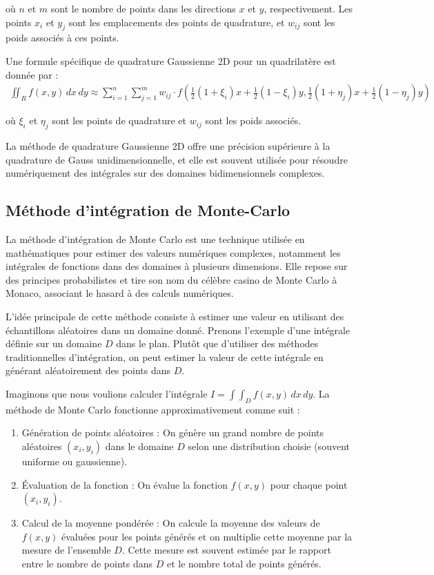 \documentclass[10pt,a4paper]{article}
\begin{document}
où $n$ et $m$ sont le nombre de points dans les directions $x$ et $y$, respectivement. Les points $x_i$ et $y_j$ sont les emplacements des points de quadrature, et $w_{ij}$ sont les poids associés à ces points.

Une formule spécifique de quadrature Gaussienne 2D pour un quadrilatère est donnée par :
\begin{align*}
\iint_{R} f(x, y) \,dx\,dy \approx \sum_{i=1}^{n} \sum_{j=1}^{m} w_{ij} \cdot f\left(\frac{1}{2}(1 + \xi_i)x + \frac{1}{2}(1 - \xi_i)y, \frac{1}{2}(1 + \eta_j)x + \frac{1}{2}(1 - \eta_j)y\right)
\end{align*}

où $\xi_i$ et $\eta_j$ sont les points de quadrature et $w_{ij}$ sont les poids associés.

La méthode de quadrature Gaussienne 2D offre une précision supérieure à la quadrature de Gauss unidimensionnelle, et elle est souvent utilisée pour résoudre numériquement des intégrales sur des domaines bidimensionnels complexes.


\subsection{Méthode d'intégration de Monte-Carlo}

La méthode d'intégration de Monte Carlo est une technique utilisée en mathématiques pour estimer des valeurs numériques complexes, notamment les intégrales de fonctions dans des domaines à plusieurs dimensions. Elle repose sur des principes probabilistes et tire son nom du célèbre casino de Monte Carlo à Monaco, associant le hasard à des calculs numériques.

L'idée principale de cette méthode consiste à estimer une valeur en utilisant des échantillons aléatoires dans un domaine donné. Prenons l'exemple d'une intégrale définie sur un domaine $D$ dans le plan. Plutôt que d'utiliser des méthodes traditionnelles d'intégration, on peut estimer la valeur de cette intégrale en générant aléatoirement des points dans $D$.

Imaginons que nous voulions calculer l'intégrale $I = \int\int_{D} f(x,y) \, dx \, dy$. La méthode de Monte Carlo fonctionne approximativement comme suit :

\begin{enumerate}
    \item Génération de points aléatoires : On génère un grand nombre de points aléatoires $(x_i, y_i)$ dans le domaine $D$ selon une distribution choisie (souvent uniforme ou gaussienne).
    \item Évaluation de la fonction : On évalue la fonction $f(x,y)$ pour chaque point $(x_i, y_i)$.
    \item Calcul de la moyenne pondérée : On calcule la moyenne des valeurs de $f(x,y)$ évaluées pour les points générés et on multiplie cette moyenne par la mesure de l'ensemble $D$. Cette mesure est souvent estimée par le rapport entre le nombre de points dans $D$ et le nombre total de points générés.
\end{enumerate}
\end{document}
